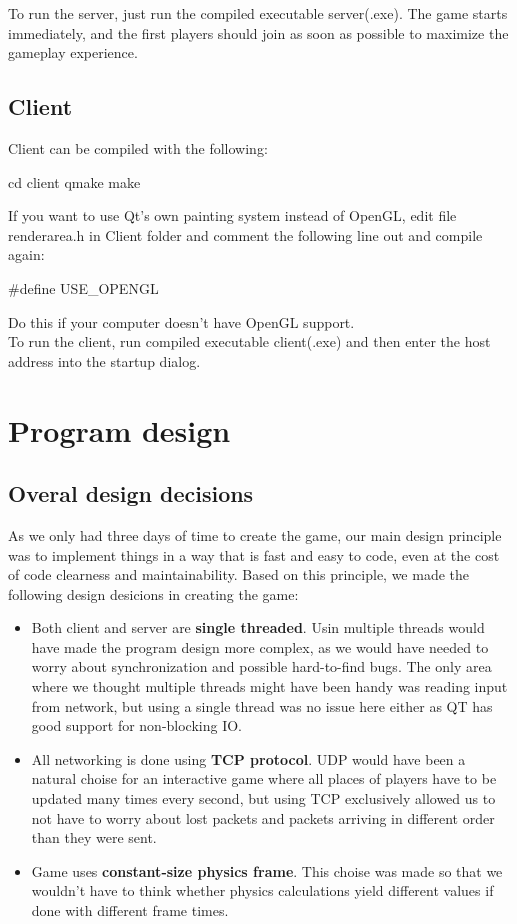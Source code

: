 \documentclass[a4paper,12pt,titlepage]{article}
\begin{document}
To run the server, just run the compiled executable server(.exe). The game starts immediately, and the first players should join as soon as possible to maximize the gameplay experience.

\subsection{Client}

Client can be compiled with the following:
    \begin{verbatimtab}[3]
        cd client
        qmake
        make
    \end{verbatimtab}
If you want to use Qt's own painting system instead of OpenGL, edit file renderarea.h in Client folder and comment the following line out and compile again: 
    \begin{verbatimtab}[3]
        #define USE_OPENGL
    \end{verbatimtab}
Do this if your computer doesn't have OpenGL support.\\
To run the client, run compiled executable client(.exe) and then enter the host address into the startup dialog.

\section{Program design}

\subsection{Overal design decisions}

As we only had three days of time to create the game, our main design principle was to implement things in a way that is fast and easy to code, even at the cost of code clearness and maintainability. Based on this principle, we made the following design desicions in creating the game:
\begin{itemize}
\item Both client and server are \textbf{single threaded}. Usin multiple threads would have made the program design more complex, as we would have needed to worry about synchronization and possible hard-to-find bugs. The only area where we thought multiple threads might have been handy was reading input from network, but using a single thread was no issue here either as QT has good support for non-blocking IO.
\item All networking is done using \textbf{TCP protocol}. UDP would have been a natural choise for an interactive game where all places of players have to be updated many times every second, but using TCP exclusively allowed us to not have to worry about lost packets and packets arriving in different order than they were sent.
\item Game uses \textbf{constant-size physics frame}. This choise was made so that we wouldn't have to think whether physics calculations yield different values if done with different frame times.
\end{itemize}
\end{document}
